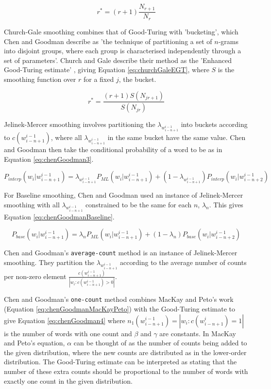 \begin{equation}
\label{eq:goodTuringSmoothing}
r^{*}=(r+1)\frac{N_{r+1}}{N_{r}}
\end{equation}

Church-Gale smoothing combines that of Good-Turing with 'bucketing', which Chen and Goodman describe as 'the technique of partitioning a set of $n$-grams into disjoint groups, where each group is characterised independently through a set of parameters'. Church and Gale describe their method as the 'Enhanced Good-Turing estimate' \cite{church1991comparison}, giving Equation \ref{eq:churchGaleEGT}, where $S$ is the smoothing function over $r$ for a fixed $j$, the bucket.

\begin{equation}
r^{*}=\frac{(r+1)S(N_{jr+1})}{S(N_{jr})}
\label{eq:churchGaleEGT}
\end{equation}

Jelinek-Mercer smoothing involves partitioning the $\lambda_{w_{i-n+1}^{i-1}}$ into buckets according to $c(w_{i-n+1}^{i-1})$, where all $\lambda_{w_{i-n+1}^{i-1}}$ in the same bucket have the same value. Chen and Goodman then take the conditional probability of a word to be as in Equation \ref{eq:chenGoodman3}.

\begin{equation}
P_{interp}(w_{i}|w_{i-n+1}^{i-1})=\lambda_{w_{i-n+1}^{i-1}}P_{ML}(w_{i}|w_{i-n+1}^{i-1})+(1-\lambda_{w_{i-n+1}^{i-1}})P_{interp}(w_{i}|w_{i-n+2}^{i-1})
\label{eq:chenGoodman3}
\end{equation}

For Baseline smoothing, Chen and Goodman used an instance of Jelinek-Mercer smoothing with all $\lambda_{w_{i-n+1}^{i-1}}$ constrained to be the same for each $n$, $\lambda_{n}$. This gives Equation \ref{eq:chenGoodmanBaseline}.

\begin{equation}
P_{base}(w_{i}|w_{i-n+1}^{i-1})=\lambda_{n}P_{ML}(w_{i}|w_{i-n+1}^{i-1})+(1-\lambda_{n})P_{base}(w_{i}|w_{i-n+2}^{i-1})
\label{eq:chenGoodmanBaseline}
\end{equation}

Chen and Goodman's \lstinline!average-count! method is an instance of Jelinek-Mercer smoothing. They partition the $\lambda_{w_{i-n+1}^{i-1}}$ according to the average number of counts per non-zero element $\frac{c(w_{i-n+1}^{i-1})}{|w_{i}:c(w_{i-n+1}^{i-1})>0|}$.

Chen and Goodman's \lstinline!one-count! method combines MacKay and Peto's \cite{mackay1995hierarchical} work (Equation \ref{eq:chenGoodmanMacKayPeto}) with the Good-Turing estimate to give Equation \ref{eq:chenGoodman4} where $n_{1}(w_{i-n+1}^{i-1})=|w_{i}:c(w_{i-n+1}^{i})=1|$ is the number of words with one count and $\beta$ and $\gamma$ are constants. In MacKay and Peto's equation, $\alpha$ can be thought of as the number of counts being added to the given distribution, where the new counts are distributed as in the lower-order distribution. The Good-Turing estimate can be interpreted as stating that the number of these extra counts should be proportional to the number of words with exactly one count in the given distribution. 

